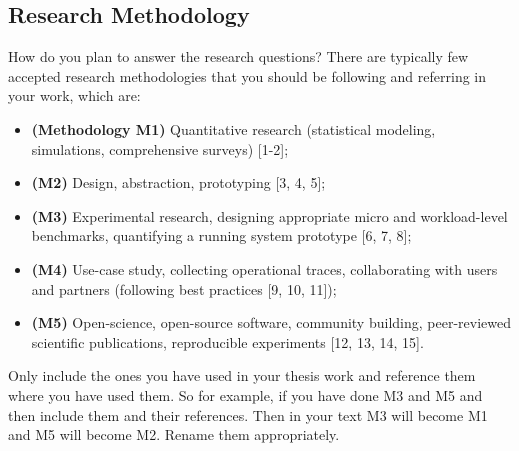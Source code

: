 \documentclass{article}
\begin{document}
\subsection{Research Methodology}
How do you plan to answer the research questions? There are typically few accepted research  methodologies that you should be following and referring in your work, which are: 
\begin{itemize}
    \item \textbf{(Methodology  M1)} Quantitative research (statistical modeling, simulations, comprehensive surveys) [1-2];
    \item \textbf{(M2)} Design, abstraction, prototyping [3, 4, 5];
    \item \textbf{(M3)} Experimental research, designing appropriate micro and workload-level benchmarks, quantifying a running system prototype [6, 7, 8];
    \item \textbf{(M4)} Use-case study, collecting operational traces, collaborating with users and partners (following best practices [9, 10, 11]);
    \item \textbf{(M5)} Open-science, open-source software, community building, peer-reviewed scientific publications, reproducible experiments [12, 13, 14, 15].
\end{itemize}

Only include the ones you have used in your thesis work and reference them where you have used them. So for example, if you have done M3 and M5 and then include them and their references. Then in your text M3 will become M1 and M5 will become M2. Rename them appropriately. 
\newline
\end{document}
